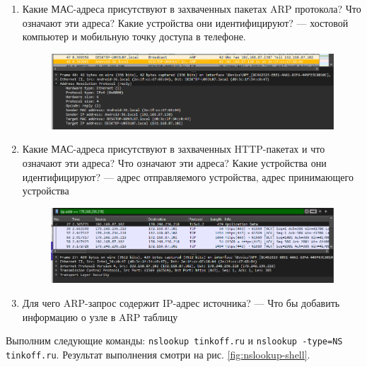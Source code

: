 \begin{enumerate}
    \item Какие МАС-адреса присутствуют в захваченных пакетах ARP протокола? Что означают эти адреса? Какие устройства они идентифицируют? --- хостовой компьютер и мобильную точку доступа в телефоне.
        \begin{figure}[H]
            \centering
            \includegraphics[width=1\linewidth]{res/arp-devices.png}
        \end{figure}
    \item Какие МАС-адреса присутствуют в захваченных HTTP-пакетах и что 
    означают эти адреса? Что означают эти адреса? Какие устройства они 
    идентифицируют? --- адрес отправляемого устройства, адрес принимающего устройства
    \begin{figure}[H]
        \centering
        \includegraphics[width=1\linewidth]{res/arp-http-devices.png}
    \end{figure}
    \item Для чего ARP-запрос содержит IP-адрес источника? --- Что бы добавить информацию о узле в ARP таблицу
\end{enumerate}


Выполним следующие команды: \verb|nslookup tinkoff.ru| и \verb|nslookup -type=NS tinkoff.ru|\;. Результат выполнения смотри на рис. \ref{fig:nslookup-shell}.

